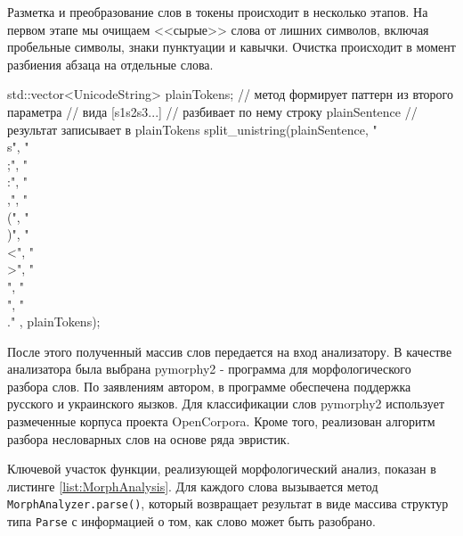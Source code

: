 Разметка и преобразование слов в токены происходит в несколько этапов. На первом этапе мы очищаем <<сырые>> слова от лишних символов, включая пробельные символы, знаки пунктуации и кавычки. Очистка происходит в момент разбиения абзаца на отдельные слова.
\begin{Verb}
std::vector<UnicodeString> plainTokens;
// метод формирует паттерн из второго параметра
// вида [s1s2s3...]
// разбивает по нему строку plainSentence
// результат записывает в plainTokens
split_unistring(plainSentence, {"\\s", "\\;", "\\:",
                                "\\,", "\\(", "\\)",
                                "\\<", "\\>", "\\{",
                                "\\}", "\\."
                                }, plainTokens);
\end{Verb}
После этого полученный массив слов передается на вход анализатору. В качестве анализатора была выбрана pymorphy2 - программа для морфологического разбора слов. По заявлениям автором, в программе обеспечена поддержка русского и украинского яызков. Для классификации слов pymorphy2 использует размеченные корпуса проекта OpenCorpora. Кроме того, реализован алгоритм разбора несловарных слов на основе ряда эвристик. 

Ключевой участок функции, реализующей морфологический анализ, показан в листинге \ref{list:MorphAnalysis}. Для каждого слова вызывается метод \lstinline{MorphAnalyzer.parse()}, который возвращает результат в виде массива структур типа \lstinline{Parse} с информацией о том, как слово может быть разобрано. 

